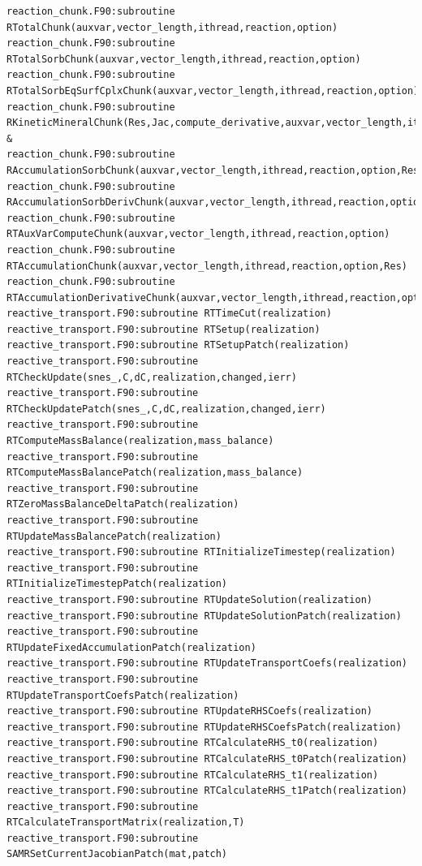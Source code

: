 \documentclass[12pt]{article}
\begin{document}
\begin{verbatim}
reaction_chunk.F90:subroutine RTotalChunk(auxvar,vector_length,ithread,reaction,option)
reaction_chunk.F90:subroutine RTotalSorbChunk(auxvar,vector_length,ithread,reaction,option)
reaction_chunk.F90:subroutine RTotalSorbEqSurfCplxChunk(auxvar,vector_length,ithread,reaction,option)
reaction_chunk.F90:subroutine RKineticMineralChunk(Res,Jac,compute_derivative,auxvar,vector_length,ithread,reaction, &
reaction_chunk.F90:subroutine RAccumulationSorbChunk(auxvar,vector_length,ithread,reaction,option,Res)
reaction_chunk.F90:subroutine RAccumulationSorbDerivChunk(auxvar,vector_length,ithread,reaction,option,J)
reaction_chunk.F90:subroutine RTAuxVarComputeChunk(auxvar,vector_length,ithread,reaction,option)
reaction_chunk.F90:subroutine RTAccumulationChunk(auxvar,vector_length,ithread,reaction,option,Res)
reaction_chunk.F90:subroutine RTAccumulationDerivativeChunk(auxvar,vector_length,ithread,reaction,option,J)
reactive_transport.F90:subroutine RTTimeCut(realization)
reactive_transport.F90:subroutine RTSetup(realization)
reactive_transport.F90:subroutine RTSetupPatch(realization)
reactive_transport.F90:subroutine RTCheckUpdate(snes_,C,dC,realization,changed,ierr)
reactive_transport.F90:subroutine RTCheckUpdatePatch(snes_,C,dC,realization,changed,ierr)
reactive_transport.F90:subroutine RTComputeMassBalance(realization,mass_balance)
reactive_transport.F90:subroutine RTComputeMassBalancePatch(realization,mass_balance)
reactive_transport.F90:subroutine RTZeroMassBalanceDeltaPatch(realization)
reactive_transport.F90:subroutine RTUpdateMassBalancePatch(realization)
reactive_transport.F90:subroutine RTInitializeTimestep(realization)
reactive_transport.F90:subroutine RTInitializeTimestepPatch(realization)
reactive_transport.F90:subroutine RTUpdateSolution(realization)
reactive_transport.F90:subroutine RTUpdateSolutionPatch(realization)
reactive_transport.F90:subroutine RTUpdateFixedAccumulationPatch(realization)
reactive_transport.F90:subroutine RTUpdateTransportCoefs(realization)
reactive_transport.F90:subroutine RTUpdateTransportCoefsPatch(realization)
reactive_transport.F90:subroutine RTUpdateRHSCoefs(realization)
reactive_transport.F90:subroutine RTUpdateRHSCoefsPatch(realization)
reactive_transport.F90:subroutine RTCalculateRHS_t0(realization)
reactive_transport.F90:subroutine RTCalculateRHS_t0Patch(realization)
reactive_transport.F90:subroutine RTCalculateRHS_t1(realization)
reactive_transport.F90:subroutine RTCalculateRHS_t1Patch(realization)
reactive_transport.F90:subroutine RTCalculateTransportMatrix(realization,T)
reactive_transport.F90:subroutine SAMRSetCurrentJacobianPatch(mat,patch) 

\end{verbatim}
\end{document}

